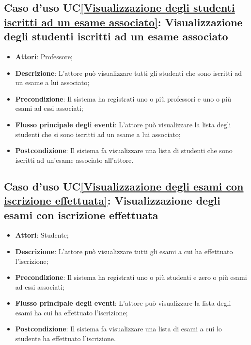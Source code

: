 \subsection{Caso d'uso UC\ref{Visualizzazione degli studenti iscritti ad un esame associato}: Visualizzazione degli studenti iscritti ad un esame associato}
\begin{itemize}
	\item \textbf{Attori}: Professore;
	\item \textbf{Descrizione}: L'attore può visualizzare tutti gli studenti che sono iscritti ad un esame a lui associato;
	\item \textbf{Precondizione}: Il sistema ha registrati uno o più professori e uno o più esami ad essi associati;
	\item \textbf{Flusso principale degli eventi}: L'attore può visualizzare la lista degli studenti che si sono iscritti ad un esame a lui associato;
	\item \textbf{Postcondizione}: Il sistema fa visualizzare una lista di studenti che sono iscritti ad un'esame associato all'attore.
\end{itemize}

\subsection{Caso d'uso UC\ref{Visualizzazione degli esami con iscrizione effettuata}: Visualizzazione degli esami con iscrizione effettuata}
\begin{itemize}
	\item \textbf{Attori}: Studente;
	\item \textbf{Descrizione}: L'attore può visualizzare tutti gli esami a cui ha effettuato l'iscrizione;
	\item \textbf{Precondizione}: Il sistema ha registrati uno o più studenti e zero o più esami ad essi associati;
	\item \textbf{Flusso principale degli eventi}: L'attore può visualizzare la lista degli esami ha cui ha effettuato l'iscrizione;
	\item \textbf{Postcondizione}: Il sistema fa visualizzare una lista di esami a cui lo studente ha effettuato l'iscrizione.
\end{itemize}
